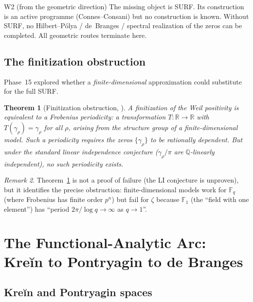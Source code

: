 \documentclass[11pt]{amsart}
\newtheorem{theorem}{Theorem}[section]
\theoremstyle{definition}
\theoremstyle{remark}
\newtheorem{remark}[theorem]{Remark}
\newcommand{\gam}{\gamma}
\begin{document}
\begin{wallbox}{W2 (from the geometric direction)}
The missing object is SURF.  Its construction is an active programme (Connes--Consani)
but no construction is known.  Without SURF, no Hilbert--Pólya / de~Branges / spectral
realization of the zeros can be completed.  All geometric routes terminate here.
\end{wallbox}

\subsection{The finitization obstruction}

Phase~15 explored whether a \emph{finite-dimensional} approximation could substitute
for the full SURF.

\begin{theorem}[Finitization obstruction, \cite{RP15}]
\label{thm:finitization}
A finitization of the Weil positivity is equivalent to a Frobenius periodicity: a
transformation $T:\mathbb{R}\to\mathbb{R}$ with $T(\gam_\rho) = \gam_\rho$ for all
$\rho$, arising from the structure group of a finite-dimensional model.
Such a periodicity requires the zeros $\{\gam_\rho\}$ to be rationally dependent.
But under the standard linear independence conjecture ($\gam_\rho/\pi$ are
$\mathbb{Q}$-linearly independent), no such periodicity exists.
\end{theorem}

\begin{remark}
Theorem~\ref{thm:finitization} is not a proof of failure (the LI conjecture is
unproven), but it identifies the precise obstruction: finite-dimensional models work
for $\mathbb{F}_q$ (where Frobenius has finite order $p^n$) but fail for $\zeta$ because
$\mathbb{F}_1$ (the ``field with one element'') has ``period $2\pi/\log q\to\infty$
as $q\to 1$''.
\end{remark}

\section{The Functional-Analytic Arc: Kreĭn to Pontryagin to de Branges}
\label{sec:functional}

\subsection{Kreĭn and Pontryagin spaces}
\end{document}

